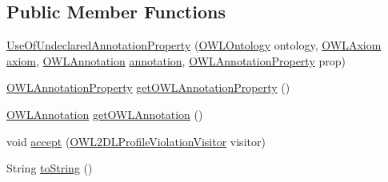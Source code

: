\subsection*{Public Member Functions}
\begin{DoxyCompactItemize}
\item 
\hyperlink{classorg_1_1semanticweb_1_1owlapi_1_1profiles_1_1_use_of_undeclared_annotation_property_abadd1824dfa445bd72d0fab18341d55d}{Use\-Of\-Undeclared\-Annotation\-Property} (\hyperlink{interfaceorg_1_1semanticweb_1_1owlapi_1_1model_1_1_o_w_l_ontology}{O\-W\-L\-Ontology} ontology, \hyperlink{interfaceorg_1_1semanticweb_1_1owlapi_1_1model_1_1_o_w_l_axiom}{O\-W\-L\-Axiom} \hyperlink{classorg_1_1semanticweb_1_1owlapi_1_1profiles_1_1_o_w_l_profile_violation_aa7c8e8910ed3966f64a2c003fb516214}{axiom}, \hyperlink{interfaceorg_1_1semanticweb_1_1owlapi_1_1model_1_1_o_w_l_annotation}{O\-W\-L\-Annotation} \hyperlink{classorg_1_1semanticweb_1_1owlapi_1_1profiles_1_1_use_of_undeclared_annotation_property_a544d987861dd59f97858bd1af742c197}{annotation}, \hyperlink{interfaceorg_1_1semanticweb_1_1owlapi_1_1model_1_1_o_w_l_annotation_property}{O\-W\-L\-Annotation\-Property} prop)
\item 
\hyperlink{interfaceorg_1_1semanticweb_1_1owlapi_1_1model_1_1_o_w_l_annotation_property}{O\-W\-L\-Annotation\-Property} \hyperlink{classorg_1_1semanticweb_1_1owlapi_1_1profiles_1_1_use_of_undeclared_annotation_property_a23a8bd29ca48c227f88286e975c0f770}{get\-O\-W\-L\-Annotation\-Property} ()
\item 
\hyperlink{interfaceorg_1_1semanticweb_1_1owlapi_1_1model_1_1_o_w_l_annotation}{O\-W\-L\-Annotation} \hyperlink{classorg_1_1semanticweb_1_1owlapi_1_1profiles_1_1_use_of_undeclared_annotation_property_a14fdad550f9ec5a5a13a79b98b56132d}{get\-O\-W\-L\-Annotation} ()
\item 
void \hyperlink{classorg_1_1semanticweb_1_1owlapi_1_1profiles_1_1_use_of_undeclared_annotation_property_a14c424b5bcd555cb06c3e01601f3f670}{accept} (\hyperlink{interfaceorg_1_1semanticweb_1_1owlapi_1_1profiles_1_1_o_w_l2_d_l_profile_violation_visitor}{O\-W\-L2\-D\-L\-Profile\-Violation\-Visitor} visitor)
\item 
String \hyperlink{classorg_1_1semanticweb_1_1owlapi_1_1profiles_1_1_use_of_undeclared_annotation_property_a705766b75bee43891a84507e0230f7f8}{to\-String} ()
\end{DoxyCompactItemize}
